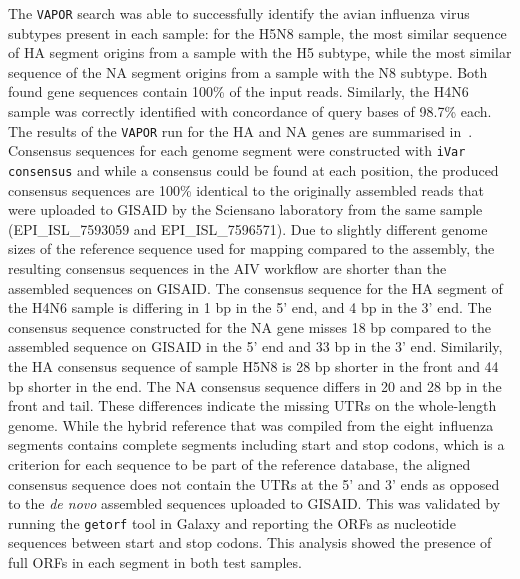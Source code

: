The \texttt{VAPOR} search was able to successfully identify the avian influenza virus subtypes present in each sample: for the H5N8 sample, the most similar sequence of \ac{HA} segment origins from a sample with the H5 subtype, while the most similar sequence of the \ac{NA} segment origins from a sample with the N8 subtype. Both found gene sequences contain 100\% of the input reads. Similarly, the H4N6 sample was correctly identified with concordance of query bases of 98.7\% each. The results of the \texttt{VAPOR} run for the \ac{HA} and \ac{NA} genes are summarised in~. \\
Consensus sequences for each genome segment were constructed with \texttt{iVar consensus} and while a consensus could be found at each position, the produced consensus sequences are 100\% identical to the originally assembled reads that were uploaded to \ac{GISAID} by the Sciensano laboratory from the same sample (EPI\_ISL\_7593059 and EPI\_ISL\_7596571). Due to slightly different genome sizes of the reference sequence used for mapping compared to the assembly, the resulting consensus sequences in the \ac{AIV} workflow are shorter than the assembled sequences on \ac{GISAID}. The consensus sequence for the \ac{HA} segment of the H4N6 sample is differing in 1 bp in the 5' end, and 4 bp in the 3' end. The consensus sequence constructed for the \ac{NA} gene misses 18 bp compared to the assembled sequence on \ac{GISAID} in the 5' end and 33 bp in the 3' end. Similarily, the \ac{HA} consensus sequence of sample H5N8 is 28 bp shorter in the front and 44 bp shorter in the end. The \ac{NA} consensus sequence differs in 20 and 28 bp in the front and tail. These differences indicate the missing \acp{UTR} on the whole-length genome. While the hybrid reference that was compiled from the eight influenza segments contains complete segments including start and stop codons, which is a criterion for each sequence to be part of the reference database, the aligned consensus sequence does not contain the \acp{UTR} at the 5' and 3' ends as opposed to the \textit{de novo} assembled sequences uploaded to \ac{GISAID}. This was validated by running the \texttt{getorf} tool in Galaxy and reporting the \acp{ORF} as nucleotide sequences between start and stop codons. This analysis showed the presence of full \acp{ORF} in each segment in both test samples.\\
